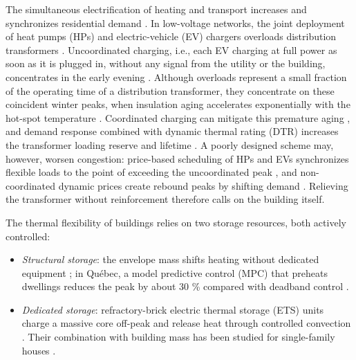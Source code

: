\documentclass[conference]{IEEEtran}
\begin{document}
The simultaneous electrification of heating and transport increases and synchronizes residential demand \cite{NavarroEspinosa2016, Muratori2018}. In low-voltage networks, the joint deployment of heat pumps (HPs) and electric-vehicle (EV) chargers overloads distribution transformers \cite{NavarroEspinosa2016}. Uncoordinated charging, i.e., each EV charging at full power as soon as it is plugged in, without any signal from the utility or the building, concentrates in the early evening \cite{Muratori2018}. Although overloads represent a small fraction of the operating time of a distribution transformer, they concentrate on these coincident winter peaks, when insulation aging accelerates exponentially with the hot-spot temperature \cite{IEEEC5791_2025, IEC60076_7_2018}. Coordinated charging can mitigate this premature aging \cite{Hilshey2013}, and demand response combined with dynamic thermal rating (DTR) increases the transformer loading reserve and lifetime \cite{Daminov2021}. A poorly designed scheme may, however, worsen congestion: price-based scheduling of HPs and EVs synchronizes flexible loads to the point of exceeding the uncoordinated peak \cite{Hein2026}, and non-coordinated dynamic prices create rebound peaks by shifting demand \cite{ParradoDuque2027}. Relieving the transformer without reinforcement therefore calls on the building itself.

The thermal flexibility of buildings relies on two storage resources, both actively controlled:
\begin{itemize}
\item \emph{Structural storage}: the envelope mass shifts heating without dedicated equipment \cite{Reynders2013, LeDreau2016}; in Québec, a model predictive control (MPC) that preheats dwellings reduces the peak by about 30 \% compared with deadband control \cite{Vallianos2023}.
\item \emph{Dedicated storage}: refractory-brick electric thermal storage (ETS) units charge a massive core off-peak and release heat through controlled convection \cite{Devia2021}. Their combination with building mass has been studied for single-family houses \cite{EtedadiAliabadi2022}.
\end{itemize}
\end{document}
